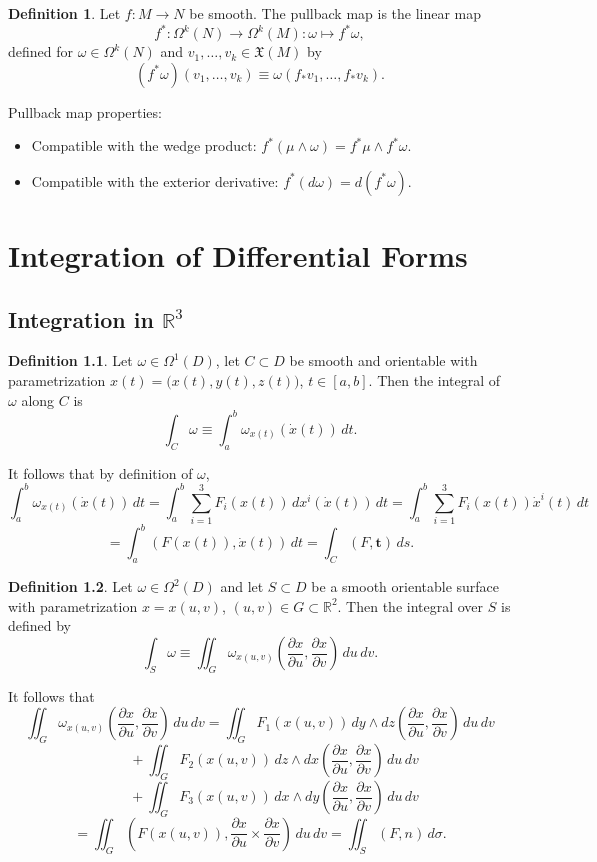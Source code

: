 \documentclass[11pt]{report}
\theoremstyle{definition}
\newtheorem{definition}{Definition}[chapter]
\theoremstyle{plain}
\theoremstyle{remark}
\newcommand{\R}{\mathbb{R}}
\newcommand{\ip}[2]{\left(#1,#2\right)}
\newcommand{\ut}{\mathbf{t}}
\begin{document}
\begin{definition}
Let $f:M\to N$ be smooth. The pullback map is the linear map
\[
f^*:\Omega^k(N)\to\Omega^k(M):\omega\mapsto f^*\omega,
\]
defined for $\omega\in\Omega^k(N)$ and $v_1,\dots,v_k\in \mathfrak X(M)$ by
\[
(f^*\omega)(v_1,\dots,v_k)\equiv \omega(f_{*}v_1,\dots,f_{*}v_k).
\]
\end{definition}

Pullback map properties:
\begin{itemize}
    \item Compatible with the wedge product: $f^*(\mu\wedge\omega)=f^*\mu\wedge f^*\omega$.
    \item Compatible with the exterior derivative: $f^*(d\omega)=d(f^*\omega)$.
\end{itemize}

\chapter{Integration of Differential Forms}

\section{Integration in \texorpdfstring{$\R^3$}{R3}}

\begin{definition}
Let $\omega\in\Omega^1(D)$, let $C\subset D$ be smooth and orientable with parametrization $x(t)=\bigl(x(t),y(t),z(t)\bigr)$, $t\in[a,b]$. Then the integral of $\omega$ along $C$ is
\[
\int_C \omega \equiv \int_a^b \omega_{x(t)}(\dot x(t))\,dt.
\]
\end{definition}

It follows that by definition of $\omega$,
\[
\int_a^b \omega_{x(t)}(\dot x(t))\,dt
=\int_a^b \sum_{i=1}^3 F_i(x(t))\,dx^i(\dot x(t))\,dt
=\int_a^b \sum_{i=1}^3 F_i(x(t))\dot x^i(t)\,dt
\]
\[
=\int_a^b \ip{F(x(t))}{\dot x(t)}\,dt
=\int_C \ip{F}{\ut}\,ds.
\]

\begin{definition}
Let $\omega\in\Omega^2(D)$ and let $S\subset D$ be a smooth orientable surface with parametrization $x=x(u,v)$, $(u,v)\in G\subset \R^2$. Then the integral over $S$ is defined by
\[
\int_S \omega \equiv \iint_G \omega_{x(u,v)}\!\left(\frac{\partial x}{\partial u},\frac{\partial x}{\partial v}\right)\,du\,dv.
\]
\end{definition}

It follows that
\[
\iint_G \omega_{x(u,v)}\!\left(\frac{\partial x}{\partial u},\frac{\partial x}{\partial v}\right)\,du\,dv
=\iint_G F_1(x(u,v))\,dy\wedge dz\!\left(\frac{\partial x}{\partial u},\frac{\partial x}{\partial v}\right)\,du\,dv
\]
\[
\qquad + \iint_G F_2(x(u,v))\,dz\wedge dx\!\left(\frac{\partial x}{\partial u},\frac{\partial x}{\partial v}\right)\,du\,dv
\]
\[
\qquad + \iint_G F_3(x(u,v))\,dx\wedge dy\!\left(\frac{\partial x}{\partial u},\frac{\partial x}{\partial v}\right)\,du\,dv
\]
\[
= \iint_G \left(F(x(u,v)),\frac{\partial x}{\partial u}\times \frac{\partial x}{\partial v}\right)\,du\,dv
= \iint_S \ip{F}{n}\,d\sigma.
\]
\end{document}
